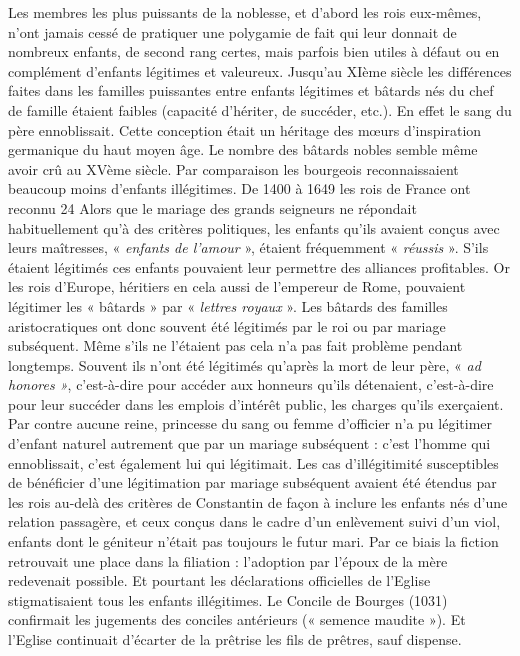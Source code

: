  Les membres les plus puissants de la noblesse, et d'abord les rois eux-mêmes, n'ont jamais cessé de pratiquer une polygamie de fait qui leur donnait de nombreux enfants, de second rang certes, mais parfois bien utiles à défaut ou en complément d'enfants légitimes et valeureux. Jusqu'au XIème siècle les différences faites dans les familles puissantes entre enfants légitimes et bâtards nés du chef de famille étaient faibles (capacité d'hériter, de succéder, etc.). En effet le sang du père ennoblissait. Cette conception était un héritage des mœurs d'inspiration germanique du haut moyen âge. Le nombre des bâtards nobles semble même avoir crû au XVème siècle. Par comparaison les bourgeois reconnaissaient beaucoup moins d'enfants illégitimes. De 1400 à 1649 les rois de France ont reconnu 24 %
 Alors que le mariage des grands seigneurs ne répondait habituellement qu'à des critères politiques, les enfants qu'ils avaient conçus avec leurs maîtresses, « \emph{enfants de l'amour} », étaient fréquemment « \emph{réussis} ». S'ils étaient légitimés ces enfants pouvaient leur permettre des alliances profitables. Or les rois d'Europe, héritiers en cela aussi de l'empereur de Rome, pouvaient légitimer les « bâtards » par « \emph{lettres royaux} ». Les bâtards des familles aristocratiques ont donc souvent été légitimés par le roi ou par mariage subséquent. Même s'ils ne l'étaient pas cela n'a pas fait problème pendant longtemps. Souvent ils n'ont été légitimés qu'après la mort de leur père, « \emph{ad honores »}, c'est-à-dire pour accéder aux honneurs qu'ils détenaient, c'est-à-dire pour leur succéder dans les emplois d'intérêt public, les charges qu'ils exerçaient. Par contre aucune reine, princesse du sang ou femme d'officier n'a pu légitimer d'enfant naturel autrement que par un mariage subséquent : c'est l'homme qui ennoblissait, c'est également lui qui légitimait. 
 Les cas d'illégitimité susceptibles de bénéficier d'une légitimation par mariage subséquent avaient été étendus par les rois au-delà des critères de Constantin de façon à inclure les enfants nés d'une relation passagère, et ceux conçus dans le cadre d'un enlèvement suivi d'un viol, enfants dont le géniteur n'était pas toujours le futur mari. Par ce biais la fiction retrouvait une place dans la filiation : l'adoption par l'époux de la mère redevenait possible. 
 Et pourtant les déclarations officielles de l'Eglise stigmatisaient tous les enfants illégitimes. Le Concile de Bourges (1031) confirmait les jugements des conciles antérieurs (« semence maudite »). Et l'Eglise continuait d'écarter de la prêtrise les fils de prêtres, sauf dispense. 
